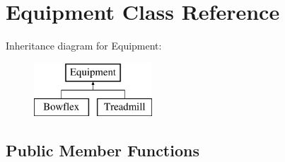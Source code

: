 \hypertarget{class_equipment}{}\section{Equipment Class Reference}
\label{class_equipment}
Inheritance diagram for Equipment\+:\begin{figure}[H]
\begin{center}
\leavevmode
\includegraphics[height=2.000000cm]{class_equipment}
\end{center}
\end{figure}
\subsection*{Public Member Functions}
